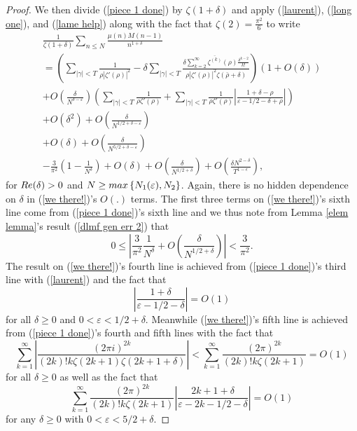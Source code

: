 \documentclass[11pt,article]{amsart}
\numberwithin{equation}{section}
\numberwithin{equation}{section}
\numberwithin{lemma}{section}
\numberwithin{prop}{section}
\begin{document}
\begin{proof}
We then divide (\ref{piece 1 done}) by $\zeta(1+\delta)$ and apply (\ref{laurent}), (\ref{long one}), and (\ref{lame help}) along with the fact that $\zeta(2)=\frac{\pi^{2}}{6}$ to write 
\begin{align}
\frac{1}{\zeta(1+\delta)}\sum_{n\leq N}\frac{\mu(n)M(n-1)}{n^{1+\delta}}\nonumber \\=\left(\sum_{\left|\gamma\right|<T}\frac{1}{\rho\left|\zeta'(\rho)\right|^{2}}-\delta\sum_{\left|\gamma\right|<T}\frac{\delta\sum_{k=2}^{\infty}\overline{\zeta^{(k)}}(\rho)\frac{\delta^{k-2}}{k!}}{\rho \left|\zeta'(\rho)\right|^{2}\zeta\left(\bar{\rho}+\delta\right)}\right)\left(1+O(\delta)\right)\nonumber \\ +O\left(\frac{\delta}{N^{\delta-\varepsilon}}\right)\left(\sum_{\left|\gamma\right|<T}\frac{1}{\rho\zeta'(\rho)}+\sum_{\left|\gamma\right|<T}\frac{1}{\rho\zeta'(\rho)}\left|\frac{1+\delta-\rho}{\varepsilon-1/2-\delta+\rho}\right|\right) \nonumber \\ +O\left(\delta^{2}\right)+O\left(\frac{\delta}{N^{1/2+\delta-\varepsilon}}\right) \nonumber \\ +O\left(\delta\right)+O\left(\frac{\delta}{N^{5/2+\delta-\varepsilon}}\right)  \nonumber \\
-\frac{3}{\pi^{2}}\left(1-\frac{1}{N^{\delta}}\right)+O\left(\delta\right)+O\left(\frac{\delta}{N^{1/2+\delta}}\right)+O\left(\frac{\delta N^{2-\delta}}{T^{1-\epsilon}}\right),\label{we there!}
\end{align}
for $\textnormal{Re}(\delta)>0$ and $N\geq \textnormal{max}\left\{N_{1}(\varepsilon),N_{2}\right\}$. Again, there is no hidden dependence on $\delta$ in (\ref{we there!})'s $O(.)$ terms. The first three terms on (\ref{we there!})'s sixth line come from (\ref{piece 1 done})'s sixth line and we thus note from Lemma \ref{elem lemma}'s result (\ref{dlmf gen err 2}) that
\begin{equation}
0\leq \left|\frac{3}{\pi^{2}}\frac{1}{N^{\delta}}+O\left(\frac{\delta}{N^{1/2+\delta}}\right)\right|<\frac{3}{\pi^{2}}. \label{dlmf gen err 3}
\end{equation}
The result on (\ref{we there!})'s fourth line is achieved from (\ref{piece 1 done})'s third line with (\ref{laurent}) and the fact that 
\begin{equation}
\left|\frac{1+\delta}{\varepsilon-1/2-\delta}\right|=O(1) \label{easy simple fact}
\end{equation}
for all $\delta\geq 0$ and $0<\varepsilon<1/2+\delta$. Meanwhile (\ref{we there!})'s fifth line is achieved from (\ref{piece 1 done})'s fourth and fifth lines with the fact that 
\begin{equation}
\sum_{k=1}^{\infty}\left|\frac{\left(2\pi i\right)^{2k}}{(2k)!k\zeta(2k+1)\zeta(2k+1+\delta)} \right|< \sum_{k=1}^{\infty}\frac{\left(2\pi\right)^{2k}}{(2k)!k\zeta(2k+1)}=O(1) \label{k sum bound}
\end{equation}
for all $\delta \geq 0$ as well as the fact that
\begin{equation}
\sum_{k=1}^{\infty}\frac{(2\pi)^{2k}}{(2k)!k\zeta(2k+1)}\left|\frac{2k+1+\delta}{\varepsilon-2k-1/2-\delta}\right|=O(1)
\end{equation}
for any $\delta\geq 0$ with $0<\varepsilon<5/2+\delta$.


\end{proof}
\end{document}

